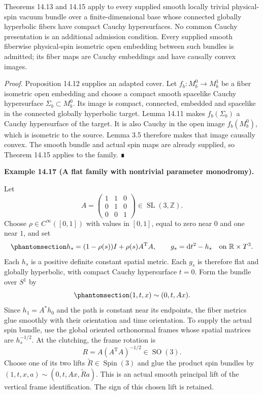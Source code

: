 \documentclass[
  english,
  11pt,
  reqno]{amsart}
\makeatletter
\newcommand{\pandocstatementheading}[1]{%
  \par\addpenalty{\@beginparpenalty}%
  \addvspace{.5\baselineskip plus .2\baselineskip minus .2\baselineskip}%
  {\normalfont\bfseries #1\par}%
  \nobreak\@afterindenttrue\@afterheading
}
\makeatother
\begin{document}
Theorems 14.13 and 14.15 apply to every supplied smooth locally trivial
physical-spin vacuum bundle over a finite-dimensional base whose
connected globally hyperbolic fibers have compact Cauchy hypersurfaces.
No common Cauchy presentation is an additional admission condition.
Every supplied smooth fiberwise physical-spin isometric open embedding
between such bundles is admitted; its fiber maps are Cauchy embeddings
and have causally convex images.

\emph{Proof.} Proposition 14.12 supplies an adapted cover. Let
\(f_b:M_b^0\to M_b^1\) be a fiber isometric open embedding and choose a
compact smooth spacelike Cauchy hypersurface \(\Sigma_b\subset M_b^0\).
Its image is compact, connected, embedded and spacelike in the connected
globally hyperbolic target. Lemma 14.11 makes \(f_b(\Sigma_b)\) a Cauchy
hypersurface of the target. It is also Cauchy in the open image
\(f_b(M_b^0)\), which is isometric to the source. Lemma 3.5 therefore
makes that image causally convex. The smooth bundle and actual spin maps
are already supplied, so Theorem 14.15 applies to the family. ∎

\pandocstatementheading{\protect{}\label{ex:torus-monodromy-family}Example 14.17 (A flat family with nontrivial parameter monodromy).}

Let \[
A=\begin{pmatrix}1&1&0\\0&1&0\\0&0&1\end{pmatrix}
\in\operatorname{SL}(3,\mathbb Z).
\] Choose \(\rho\in C^\infty([0,1])\) with values in \([0,1]\), equal to
zero near \(0\) and one near \(1\), and set
\begin{equation}\protect\phantomsection\label{eq:torus-monodromy-metric}{
h_s=(1-\rho(s))I+\rho(s)A^{\mathrm T}A,
\qquad
g_s=\mathrm dt^2-h_s
\quad\text{on }\mathbb R\times T^3.
}\end{equation} Each \(h_s\) is a positive definite constant spatial
metric. Each \(g_s\) is therefore flat and globally hyperbolic, with
compact Cauchy hypersurface \(t=0\). Form the bundle over \(S^1\) by
\begin{equation}\protect\phantomsection\label{eq:torus-monodromy-clutching}{
(1,t,x)\sim(0,t,Ax).
}\end{equation} Since \(h_1=A^*h_0\) and the path is constant near its
endpoints, the fiber metrics glue smoothly with their orientation and
time orientation. To supply the actual spin bundle, use the global
oriented orthonormal frames whose spatial matrices are \(h_s^{-1/2}\).
At the clutching, the frame rotation is \[
R=A(A^{\mathrm T}A)^{-1/2}\in\operatorname{SO}(3).
\] Choose one of its two lifts \(\widetilde R\in\operatorname{Spin}(3)\)
and glue the product spin bundles by
\((1,t,x,a)\sim(0,t,Ax,\widetilde R a)\). This is an actual smooth
principal lift of the vertical frame identification. The sign of this
chosen lift is retained.
\end{document}
